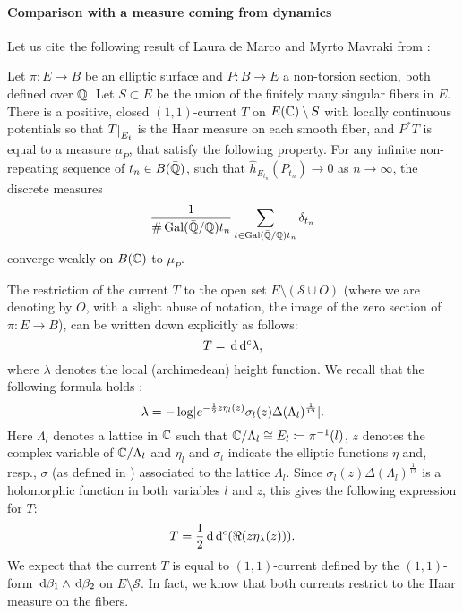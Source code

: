 \documentclass[a4paper,12pt]{article}
\begin{document}
\paragraph{Comparison with a measure coming from dynamics}

Let us cite the following result of Laura de Marco and Myrto Mavraki from \cite[Section 3]{demarcomavraki}:
\begin{theorem}\label{Theo:demarcomavraki}
	Let $\pi:E \rightarrow B$ be an elliptic surface and $P : B \rightarrow E$ a non-torsion section, both defined over $\mathbb Q$. Let $S \subset E$ be the union of the finitely many singular fibers in $E$. There is a positive, closed $(1,1)$-current $T$ on $E(\mathbb C) \setminus S$ with locally continuous potentials so that $\restricts{T}{E_t}$ is the Haar measure on each smooth fiber, and $P^*T$ is equal to a measure $\mu_{P}$, that satisfy the following property. For any infinite non-repeating sequence of $t_n \in B(\bar{\mathbb Q})$, such that $\hat{h}_{E_{t_n}}(P_{t_n}) \rightarrow 0$ as $n \to \infty$, the discrete measures
	\[
	\frac{1}{\#\operatorname{Gal}(\bar{\mathbb Q}/\mathbb Q)t_n}\sum_{t \in \operatorname{Gal}(\bar{\mathbb Q}/\mathbb Q)t_n}\delta_{t_n}
	\]
	converge weakly on $B(\mathbb C)$ to $\mu_P$.
\end{theorem}

The restriction of the current $T$ to the open set $E \setminus (\mathcal{S} \cup O)$ (where we are denoting by $O$, with a slight abuse of notation, the image of the zero section of $\pi:E \rightarrow B$), can be written down explicitly as follows:
\begin{equation}\label{Expr:11current}
	T=\,\mathrm d \,\mathrm d^c {\lambda},
\end{equation}
where $\lambda$ denotes the local (archimedean) height function. We recall that the following formula holds \cite[p. 466]{silverman1994advanced}:
\begin{equation}\label{Expr:altezzalocale}
	\lambda=-\log \lvert e^{-\frac{1}{2}z\eta_{l}(z)}\sigma_{l}(z)\Delta(\Lambda_{l})^{\frac{1}{12}}\rvert.
\end{equation}
Here $\Lambda_{l}$ denotes a lattice in $\mathbb C$ such that $\mathbb C/\Lambda_{l} \cong E_{l} \coloneqq \pi^{-1}(l)$, $z$ denotes the complex variable of $\mathbb C/\Lambda_{l}$ and $\eta_{l}$ and $\sigma_{l}$ indicate the elliptic functions $\eta$ and, resp., $\sigma$ (as defined in \cite[VI.3.1,I.5.4]{silverman1994advanced}) associated to the lattice $\Lambda_{l}$. Since $\sigma_{l}(z)\Delta(\Lambda_{l})^{\frac{1}{12}}$ is a holomorphic function in both variables $l$ and $z$, this gives the following expression for $T$:
\begin{equation}\label{Expr:11current2}
	T=\frac{1}{2}\,\mathrm d \,\mathrm d^c(\Re (z\eta_{\lambda}(z))).
\end{equation}
We expect that the current $T$ is equal to $(1,1)$-current defined by the $(1,1)$-form $\,\mathrm d \beta_1 \wedge \,\mathrm d \beta_2$ on $E \setminus \mathcal{S}$. In fact, we know that both currents restrict to the Haar measure on the fibers.
\end{document}
